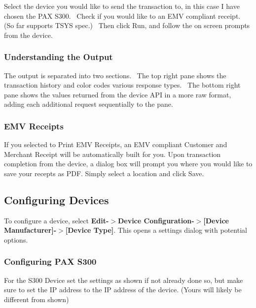 Select the device you would like to send the transaction to, in this case I have chosen the P\+AX S300.~\newline
 Check if you would like to an E\+MV compliant receipt. (So far supports T\+S\+YS spec.)~\newline
 Then click Run, and follow the on screen prompts from the device. ~\newline
 

\subsubsection*{Understanding the Output}

The output is separated into two sections.~\newline
 The top right pane shows the transaction history and color codes various response types.~\newline
 The bottom right pane shows the values returned from the device A\+PI in a more raw format, adding each additional request sequentially to the pane.~\newline


\subsubsection*{E\+MV Receipts}

If you selected to Print E\+MV Receipts, an E\+MV compliant Customer and Merchant Receipt will be automatically built for you. Upon transaction completion from the device, a dialog box will prompt you where you would like to save your recepts as P\+DF. Simply select a location and click Save.~\newline


\subsection*{Configuring Devices}

To configure a device, select {\bfseries Edit-\/$>$Device Configuration-\/$>$\mbox{[}Device Manufacturer\mbox{]}-\/$>$\mbox{[}Device Type\mbox{]}}. This opens a settings dialog with potential options.

\subsubsection*{Configuring P\+AX S300}

For the S300 Device set the settings as shown if not already done so, but make sure to set the IP address to the IP address of the device. (Yours will likely be different from shown)~\newline




